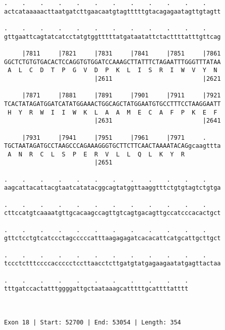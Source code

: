 \documentclass{article}
\begin{document}
\begin{Verbatim}
.    .    .    .    .    .    .    .    .    .    .    .    
actcataaaaacttaatgatcttgaacaatgtagtttttgtacagagaatagttgtagtt
                                                            
.    .    .    .    .    .    .    .    .    .    .    .    
gttgaattcagtatcatcctatgtggtttttatgataatattctacttttatttgttcag
                                                            
     |7811     |7821     |7831     |7841     |7851     |7861
GGCTCTGTGTGACACTCCAGGTGTGGATCCAAAGCTTATTTCTAGAATTTGGGTTTATAA
 A  L  C  D  T  P  G  V  D  P  K  L  I  S  R  I  W  V  Y  N 
                         |2611                         |2621
  
     |7871     |7881     |7891     |7901     |7911     |7921
TCACTATAGATGGATCATATGGAAACTGGCAGCTATGGAATGTGCCTTTCCTAAGGAATT
 H  Y  R  W  I  I  W  K  L  A  A  M  E  C  A  F  P  K  E  F 
                         |2631                         |2641
  
     |7931     |7941     |7951     |7961     |7971     .    
TGCTAATAGATGCCTAAGCCCAGAAAGGGTGCTTCTTCAACTAAAATACAGgcaagttta
 A  N  R  C  L  S  P  E  R  V  L  L  Q  L  K  Y  R          
                         |2651                              
  
.    .    .    .    .    .    .    .    .    .    .    .    
aagcattacattacgtaatcatatacggcagtatggttaaggtttctgtgtagtctgtga
                                                            
.    .    .    .    .    .    .    .    .    .    .    .    
cttccatgtcaaaatgttgcacaagccagttgtcagtgacagttgccatcccacactgct
                                                            
.    .    .    .    .    .    .    .    .    .    .    .    
gttctcctgtcatccctagcccccatttaagagagatcacacattcatgcattgcttgct
                                                            
.    .    .    .    .    .    .    .    .    .    .    .    
tccctctttccccaccccctccttaacctcttgatgtatgagaagaatatgagttactaa
                                                            
.    .    .    .    .    .    .    .    .    .    .
tttgatccactatttggggattgctaataaagcatttttgcattttatttt
                                                   
                                                   
 
Exon 18 | Start: 52700 | End: 53054 | Length: 354




\end{Verbatim}
\end{document}
